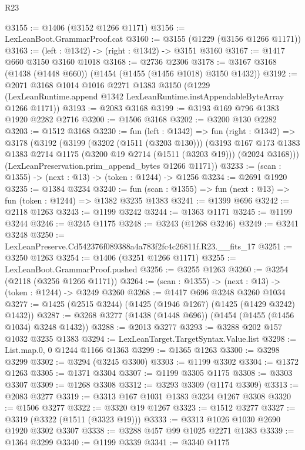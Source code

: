 \begin{lexlean}{R23}
\begin{coremodule}
@3155 := @1406 (@3152 @1266 @1171)
@3156 := LexLeanBoot.GrammarProof.cat
@3160 := @3155 (@1229 (@3156 @1266 @1171))
@3163 := (left : @1342) -> (right : @1342) -> @3151 @3160
@3167 := @1417 @660 @3150 @3160 @1018
@3168 := @2736 @2306
@3178 := @3167 @3168 (@1438 (@1448 @660)) (@1454 (@1455 (@1456 @1018) @3150 @1432))
@3192 := @2071
    @3168
    @1014
    @1016
    @2271
    @1383
    @3150
    (@1229 (LexLeanRuntime.append @1342 LexLeanRuntime.instAppendableByteArray @1266 @1171))
@3193 := @2083 @3168
@3199 := @3193 @169 @796 @1383 @1920 @2282 @2716
@3200 := @1506 @3168
@3202 := @3200 @130 @2282
@3203 := @1512 @3168
@3230 := fun (left : @1342) =>
  fun (right : @1342) =>
  @3178
    (@3192
      (@3199
        (@3202 (@1511 (@3203 @130)))
        (@3193
          @167
          @173
          @1383
          @1383
          @2714
          @1175
          (@3200 @19 @2714 (@1511 (@3203 @19)))
          (@2024 @3168)))
      (LexLeanPreservation.prim_append_bytes @1266 @1171))
@3233 := (scan : @1355) -> (next : @13) -> (token : @1244) -> @1256
@3234 := @2691 @1920
@3235 := @1384 @3234
@3240 := fun (scan : @1355) => fun (next : @13) => fun (token : @1244) => @1382 @3235 @1383
@3241 := @1399 @696
@3242 := @2118 @1263
@3243 := @1199 @3242
@3244 := @1363 @1171
@3245 := @1199 @3244
@3246 := @3245 @1175
@3248 := @3243 (@1268 @3246)
@3249 := @3241 @3248
@3250 := LexLeanPreserve.Cd542376f089388a4a783f2fc4c26811f.R23.__fits_17
@3251 := @3250 @1263
@3254 := @1406 (@3251 @1266 @1171)
@3255 := LexLeanBoot.GrammarProof.pushed
@3256 := @3255 @1263
@3260 := @3254 (@2118 (@3256 @1266 @1171))
@3264 := (scan : @1355) -> (next : @13) -> (token : @1244) -> @3249 @3260
@3268 := @1417 @696 @3248 @3260 @1034
@3277 := @1425 (@2515 @3244) (@1425 (@1946 @1267) (@1425 (@1429 @3242) @1432))
@3287 := @3268 @3277 (@1438 (@1448 @696)) (@1454 (@1455 (@1456 @1034) @3248 @1432))
@3288 := @2013 @3277
@3293 := @3288 @202 @157 @1032 @3235 @1383
@3294 := LexLeanTarget.TargetSyntax.Value.list
@3298 := List.map.{0, 0} @1244 @1166 @1363
@3299 := @1365 @1263
@3300 := @3298 @3299
@3302 := @3294 (@3245 @3300)
@3303 := @1199 @3302
@3304 := @1372 @1263
@3305 := @1371 @3304
@3307 := @1199 @3305 @1175
@3308 := @3303 @3307
@3309 := @1268 @3308
@3312 := @3293 @3309 (@1174 @3309)
@3313 := @2083 @3277
@3319 := @3313 @167 @1031 @1383 @3234 @1267 @3308
@3320 := @1506 @3277
@3322 := @3320 @19 @1267
@3323 := @1512 @3277
@3327 := @3319 (@3322 (@1511 (@3323 @19)))
@3333 := @3313 @1026 @1030 @2690 @1920 @3302 @3307
@3338 := @3288 @457 @99 @1025 @2271 @1383
@3339 := @1364 @3299
@3340 := @1199 @3339
@3341 := @3340 @1175

\end{coremodule}
\end{lexlean}
